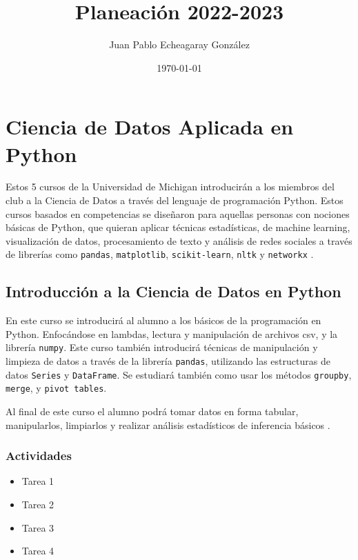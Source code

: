 \documentclass{article}
\title{Planeación 2022-2023}
\author{Juan Pablo Echeagaray González}
\date{\today}
\begin{document}
    \begin{titlepage}
        \maketitle
    \end{titlepage}

    \tableofcontents
    \clearpage

    \section{Ciencia de Datos Aplicada en Python}

        Estos 5 cursos de la Universidad de Michigan introducirán a los miembros del club a la Ciencia de Datos a través del lenguaje de programación Python. Estos cursos basados en competencias se diseñaron para aquellas personas con nociones básicas de Python, que quieran aplicar técnicas estadísticas, de machine learning, visualización de datos, procesamiento de texto y análisis de redes sociales a través de librerías como \texttt{pandas}, \texttt{matplotlib}, \texttt{scikit-learn}, \texttt{nltk} y \texttt{networkx} \cite{applied-ds}.

        \subsection{Introducción a la Ciencia de Datos en Python}

            En este curso se introducirá al alumno a los básicos de la programación en Python. Enfocándose en lambdas, lectura y manipulación de archivos csv, y la librería \texttt{numpy}. Este curso también introducirá técnicas de manipulación y limpieza de datos a través de la librería \texttt{pandas}, utilizando las estructuras de datos \texttt{Series} y \texttt{DataFrame}. Se estudiará también como usar los métodos \texttt{groupby}, \texttt{merge}, y \texttt{pivot tables}.

            Al final de este curso el alumno podrá tomar datos en forma tabular, manipularlos, limpiarlos y realizar análisis estadísticos de inferencia básicos \cite{intro-ds}.

            \subsubsection{Actividades}

                \begin{itemize}
                    \item Tarea 1
                    \item Tarea 2
                    \item Tarea 3
                    \item Tarea 4
                \end{itemize}
\end{document}
